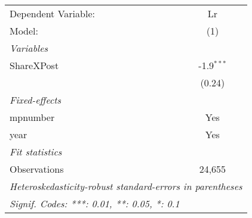 
\begingroup
\centering
\begin{tabular}{lc}
   \tabularnewline \midrule \midrule
   Dependent Variable: & Lr\\  
   Model:              & (1)\\  
   \midrule
   \emph{Variables}\\
   ShareXPost          & -1.9$^{***}$\\   
                       & (0.24)\\   
   \midrule
   \emph{Fixed-effects}\\
   mpnumber            & Yes\\  
   year                & Yes\\  
   \midrule
   \emph{Fit statistics}\\
   Observations        & 24,655\\  
   \midrule \midrule
   \multicolumn{2}{l}{\emph{Heteroskedasticity-robust standard-errors in parentheses}}\\
   \multicolumn{2}{l}{\emph{Signif. Codes: ***: 0.01, **: 0.05, *: 0.1}}\\
\end{tabular}
\par\endgroup


